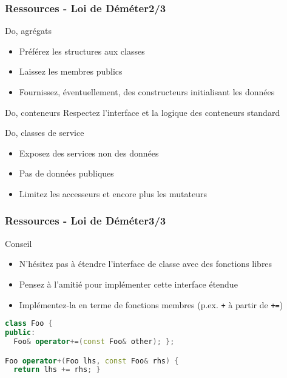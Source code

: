 \documentclass[C++.tex]{subfiles}
\begin{document}
\begin{frame}
	\frametitle{Ressources - Loi de Déméter\titlehfill{}2/3}
	\begin{exampleblock}{Do, agrégats}
		\begin{itemize}
			\item Préférez les structures aux classes
			\item Laissez les membres publics
			\item Fournissez, éventuellement, des constructeurs initialisant les données
		\end{itemize}

	\end{exampleblock}

	\begin{exampleblock}{Do, conteneurs}
		Respectez l'interface et la logique des conteneurs standard

	\end{exampleblock}

	\begin{exampleblock}{Do, classes de service}
		\begin{itemize}
			\item Exposez des services non des données
			\item Pas de données publiques
			\item Limitez les accesseurs et encore plus les mutateurs
		\end{itemize}
	\end{exampleblock}
\end{frame}

\begin{frame}[fragile]
	\frametitle{Ressources - Loi de Déméter\titlehfill{}3/3}
	\begin{block}{Conseil}
		\begin{itemize}
			\item N'hésitez pas à étendre l'interface de classe avec des fonctions libres


			\item Pensez à l'amitié pour implémenter cette interface étendue
			\item Implémentez-la en terme de fonctions membres (p.ex. \lstinline|+| à partir de \lstinline|+=|)
		\end{itemize}
	\end{block}

	\begin{lstlisting}[language=C++]
class Foo {
public:
  Foo& operator+=(const Foo& other); };

Foo operator+(Foo lhs, const Foo& rhs) {
  return lhs += rhs; }\end{lstlisting}
\end{frame}
\end{document}
